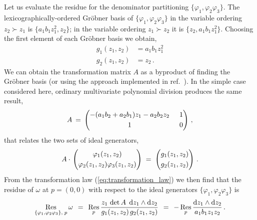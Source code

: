 \documentclass[dvipsnames,preprint,12pt,sort&compress]{elsarticle}
\newcounter{bla}
\def\d{{\rm d}}
\begin{document}
Let us evaluate the residue for the denominator partitioning $\{ \varphi_1, \varphi_2 \varphi_3 \}$.
The lexicographically-ordered Gr{\"o}bner basis of $\{ \varphi_1, \varphi_2 \varphi_3 \}$ in the variable ordering
$z_2 \succ z_1$ is $\{ a_1 b_1 z_1^2, z_2 \}$; in the variable
ordering $z_1 \succ z_2$ it is $\{ z_2, a_1 b_1 z_1^2 \}$. Choosing the first
element of each Gr{\"o}bner basis we obtain,
\begin{align}
g_1(z_1,z_2)  &=  a_1 b_1 z_1^2 \\
g_2(z_1,z_2)  &=  z_2 \,.
\end{align}
We can obtain the transformation matrix $A$ as a byproduct of finding the Gr{\"o}bner
basis (or using the approach implemented in ref.~\cite{Lichtblau}). In the simple case
considered here, ordinary multivariate polynomial division produces the same
result,
\begin{equation}
A \hspace{0.7mm}=\hspace{0.7mm} \begin{pmatrix} -(a_1 b_2 + a_2 b_1) z_1 - a_2 b_2 z_2 & \hspace{1.5mm} 1 \\[1mm]
1 & \hspace{1.5mm} 0 \end{pmatrix}\,,
\end{equation}
that relates the two sets of ideal generators,
\begin{equation}
A \cdot \hspace{0.4mm} \begin{pmatrix} \varphi_1(z_1, z_2) \\[1mm] \varphi_2(z_1, z_2) \varphi_3(z_1, z_2) \end{pmatrix}
\hspace{1mm}=\hspace{1mm} \begin{pmatrix} g_1(z_1, z_2) \\[1mm] g_2(z_1, z_2) \end{pmatrix} \,.
\end{equation}
From the transformation law (\ref{eq:transformation_law}) we then find that the residue of $\omega$
at $p = (0,0)$ with respect to the ideal generators $\{ \varphi_1, \varphi_2 \varphi_3 \}$ is
\begin{equation}
\mathop{\mathrm{Res}}_{\{ \varphi_1, \varphi_2 \varphi_3 \}, \hspace{0.8mm} p} \omega
\hspace{1.5mm}=\hspace{1.5mm} \mathop{\mathrm{Res}}_p \frac{z_1 \hspace{0.5mm}
\det A \hspace{1.6mm} \d z_1 \wedge \d z_2}{g_1(z_1, z_2) \hspace{0.5mm} g_2 (z_1, z_2)}
\hspace{1.5mm}=\hspace{1.5mm} - \mathop{\mathrm{Res}}_p \frac{\d z_1 \wedge \d z_2}
{a_1 b_1 z_1 z_2} \,.
\label{eq:residue_omega_{phi1_phi2phi3}}
\end{equation}
\end{document}
